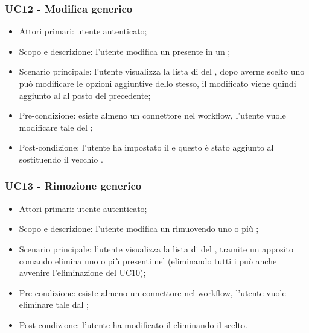 \subsubsection{UC12 - Modifica  generico}
\begin{itemize}
	\item  Attori primari: utente autenticato;
	\item  Scopo e descrizione: l'utente modifica un  presente in un ;
	\item  Scenario principale: l'utente visualizza la lista di  del , dopo averne scelto uno può modificare le opzioni aggiuntive dello stesso, il  modificato viene quindi aggiunto al  al posto del precedente;
	\item  Pre-condizione: esiste almeno un connettore nel workflow, l'utente vuole modificare tale  del ;
	\item  Post-condizione: l'utente ha impostato il  e questo è stato aggiunto al  sostituendo il vecchio .
\end{itemize}
\subsubsection{UC13 - Rimozione  generico}
\begin{itemize}
	\item  Attori primari: utente autenticato;
	\item  Scopo e descrizione: l'utente modifica un  rimuovendo uno o più ;
	\item  Scenario principale: l'utente visualizza la lista di  del , tramite un apposito comando elimina uno o più  presenti nel  (eliminando tutti i  può anche avvenire l'eliminazione del  UC10);
	\item  Pre-condizione: esiste almeno un connettore nel workflow, l'utente vuole eliminare tale  dal ;
	\item  Post-condizione: l'utente ha modificato il  eliminando il  scelto.
\end{itemize}

